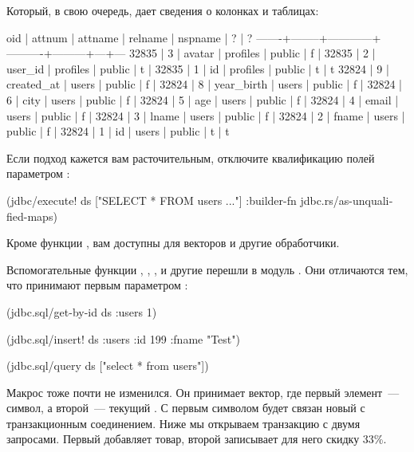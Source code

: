 Который, в свою очередь, дает сведения о колонках и таблицах:

\begin{english}
  \begin{text}
  oid  | attnum |  attname   | relname  | nspname | ? | ?
-------+--------+------------+----------+---------+---+---
 32835 |      3 | avatar     | profiles | public  | f |
 32835 |      2 | user_id    | profiles | public  | t |
 32835 |      1 | id         | profiles | public  | t | t
 32824 |      9 | created_at | users    | public  | f |
 32824 |      8 | year_birth | users    | public  | f |
 32824 |      6 | city       | users    | public  | f |
 32824 |      5 | age        | users    | public  | f |
 32824 |      4 | email      | users    | public  | f |
 32824 |      3 | lname      | users    | public  | f |
 32824 |      2 | fname      | users    | public  | f |
 32824 |      1 | id         | users    | public  | t | t
  \end{text}
\end{english}

Если подход кажется вам расточительным, отключите квалификацию полей параметром :

\begin{english}
  \begin{clojure}
(jdbc/execute!
 ds
 ["SELECT * FROM users ..."]
 {:builder-fn jdbc.rs/as-unqualified-maps})
  \end{clojure}
\end{english}

Кроме функции , вам доступны  для векторов и другие обработчики.

Вспомогательные функции , , ,  и другие перешли в модуль . Они отличаются тем, что принимают первым параметром :

\begin{english}
  \begin{clojure}
(jdbc.sql/get-by-id ds :users 1)

(jdbc.sql/insert! ds :users {:id 199 :fname "Test"})

(jdbc.sql/query ds ["select * from users"])
  \end{clojure}
\end{english}

Макрос  тоже почти не изменился. Он принимает вектор, где первый элемент~--- символ, а второй~--- текущий . С первым символом будет связан новый  с транзакционным соединением. Ниже мы открываем транзакцию с двумя запросами. Первый добавляет товар, второй записывает для него скидку 33\%.

